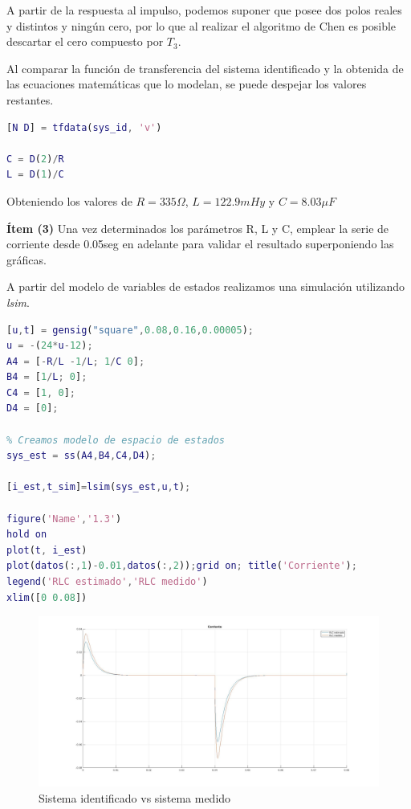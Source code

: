 \documentclass{article}
\begin{document}
  A partir de la respuesta al impulso, podemos suponer que posee dos polos reales y distintos y 
  ningún cero, por lo que al realizar el algoritmo de Chen es posible descartar el cero compuesto por $T_3$.

  Al comparar la función de transferencia del sistema identificado y la obtenida de las ecuaciones matemáticas
  que lo modelan, se puede despejar los valores restantes.

  \begin{lstlisting}[language=matlab]    
[N D] = tfdata(sys_id, 'v')

C = D(2)/R
L = D(1)/C
  \end{lstlisting}

  Obteniendo los valores de $R=335\Omega$, $L=122.9mHy$ y $C=8.03\mu F$
  \par
  \textbf{Ítem (3)} Una vez determinados los parámetros R, L y C, emplear la serie de corriente desde
  0.05seg en adelante para validar el resultado superponiendo las gráficas.

  A partir del modelo de variables de estados realizamos una simulación utilizando \textit{lsim}.

  \begin{lstlisting}[language=matlab]    
[u,t] = gensig("square",0.08,0.16,0.00005);
u = -(24*u-12);
A4 = [-R/L -1/L; 1/C 0];
B4 = [1/L; 0];
C4 = [1, 0];
D4 = [0];

% Creamos modelo de espacio de estados
sys_est = ss(A4,B4,C4,D4);

[i_est,t_sim]=lsim(sys_est,u,t);
 
figure('Name','1.3')
hold on
plot(t, i_est)
plot(datos(:,1)-0.01,datos(:,2));grid on; title('Corriente');
legend('RLC estimado','RLC medido')
xlim([0 0.08])
      \end{lstlisting}

      \begin{figure}[!h]
        \centering
        \includegraphics[width=1\textwidth]{img/rlc3-1.jpg}
        \caption{Sistema identificado vs sistema medido}
      \end{figure}
\end{document}
